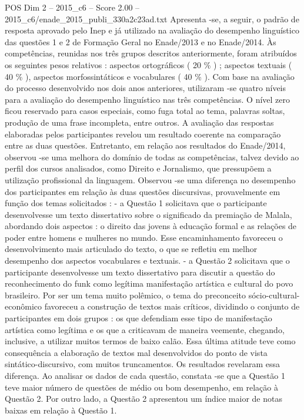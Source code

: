 \begin{textsample}{POS Dim 2 – 2015\_c6 – Score 2.00 – 2015\_c6/enade\_2015\_publi\_330a2c23ad.txt}
Apresenta -se, a seguir, o padrão de resposta aprovado pelo Inep e já utilizado na avaliação do desempenho linguístico das questões 1 e 2 de Formação Geral no Enade/2013 e no Enade/2014.
Às competências, reunidas nos três grupos descritos anteriormente, foram atribuídos os seguintes pesos relativos : aspectos ortográficos ( 20 \% ) ; aspectos textuais ( 40 \% ), aspectos morfossintáticos e vocabulares ( 40 \% ).
Com base na avaliação do processo desenvolvido nos dois anos anteriores, utilizaram -se quatro níveis para a avaliação do desempenho linguístico nas três competências.
O nível zero ficou reservado para casos especiais, como fuga total ao tema, palavras soltas, produção de uma frase incompleta, entre outros.
A avaliação das respostas elaboradas pelos participantes revelou um resultado coerente na comparação entre as duas questões.
Entretanto, em relação aos resultados do Enade/2014, observou -se uma melhora do domínio de todas as competências, talvez devido ao perfil dos cursos analisados, como Direito e Jornalismo, que pressupõem a utilização profissional da linguagem.
Observou -se uma diferença no desempenho dos participantes em relação às duas questões discursivas, provavelmente em função dos temas solicitados : - a Questão 1 solicitava que o participante desenvolvesse um texto dissertativo sobre o significado da premiação de Malala, abordando dois aspectos : o direito das jovens à educação formal e as relações de poder entre homens e mulheres no mundo.
Esse encaminhamento favoreceu o desenvolvimento mais articulado do texto, o que se refletiu em melhor desempenho dos aspectos vocabulares e textuais. - a Questão 2 solicitava que o participante desenvolvesse um texto dissertativo para discutir a questão do reconhecimento do funk como legítima manifestação artística e cultural do povo brasileiro.
Por ser um tema muito polêmico, o tema do preconceito sócio-cultural-econômico favoreceu a construção de textos mais críticos, dividindo o conjunto de participantes em dois grupos : os que defendiam esse tipo de manifestação artística como legítima e os que a criticavam de maneira veemente, chegando, inclusive, a utilizar muitos termos de baixo calão.
Essa última atitude teve como consequência a elaboração de textos mal desenvolvidos do ponto de vista sintático-discursivo, com muitos truncamentos.
Os resultados revelaram essa diferença.
Ao analisar os dados de cada questão, constata -se que a Questão 1 teve maior número de questões de médio ou bom desempenho, em relação à Questão 2.
Por outro lado, a Questão 2 apresentou um índice maior de notas baixas em relação à Questão 1.

\end{textsample}
